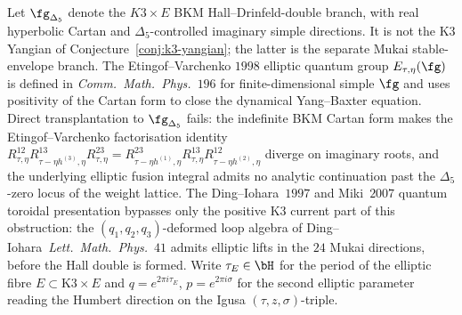 \begin{proposition}
\label{prop:k3qt-elliptic-bkm-dim-extension}
Let $\fg_{\Delta_5}$ denote the $K3\times E$ BKM
Hall--Drinfeld-double branch, with real hyperbolic Cartan and
$\Delta_5$-controlled imaginary simple directions. It is not the K3
Yangian of Conjecture~\ref{conj:k3-yangian}; the latter is the separate
Mukai stable-envelope branch. The Etingof--Varchenko $1998$ elliptic quantum group
$E_{\tau, \eta}(\fg)$ is defined in \emph{Comm.\ Math.\ Phys.}~$196$
for finite-dimensional simple $\fg$ and uses positivity of the
Cartan form to close the dynamical Yang--Baxter equation. Direct
transplantation to $\fg_{\Delta_5}$ fails: the indefinite BKM Cartan
form makes the Etingof--Varchenko
factorisation identity
$R_{\tau, \eta}^{12} R_{\tau - \eta h^{(3)}, \eta}^{13}
R_{\tau, \eta}^{23}
= R_{\tau - \eta h^{(1)}, \eta}^{23}
R_{\tau, \eta}^{13} R_{\tau - \eta h^{(2)}, \eta}^{12}$
diverge on imaginary roots, and the underlying elliptic fusion
integral admits no analytic continuation past the $\Delta_5$-zero
locus of the weight lattice. The Ding--Iohara~$1997$ and Miki~$2007$
quantum toroidal presentation bypasses only the positive K3 current
part of this obstruction: the $(q_1,q_2,q_3)$-deformed loop algebra of
Ding--Iohara~\emph{Lett.\ Math.\ Phys.}~$41$ admits elliptic lifts in
the $24$ Mukai directions, before the Hall double is formed.
Write $\tau_E \in \bH$ for the period of the elliptic fibre
$E \subset \mathrm K3 \times E$ and $q = e^{2\pi i \tau_E}$,
$p = e^{2\pi i \sigma}$ for the second elliptic parameter reading
the Humbert direction on the Igusa $(\tau, z, \sigma)$-triple.


\end{proposition}
